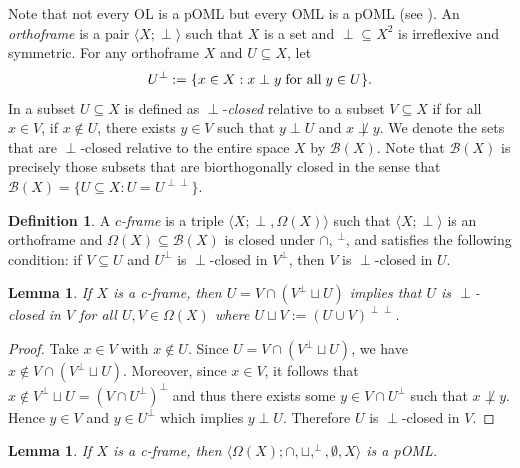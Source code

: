\documentclass{amsart}
\theoremstyle{plain}
\newtheorem{lemma}[theorem]{Lemma}
\theoremstyle{definition}
\newtheorem{definition}[theorem]{Definition}
\begin{document}
   Note that not every OL is a pOML but every OML is a pOML (see \cite[Propositions 2 and 3]{leem}).                                    An \emph{orthoframe} is a pair $\langle X;\perp\rangle$ such that $X$ is a set and $\perp\subseteq X^2$ is irreflexive and symmetric. For any orthoframe $X$ and $U\subseteq X$, let \[U^{\perp}:=\{x\in X:x\perp y\hspace{.1cm}\text{for all}\hspace{.1cm}y\in U\}.\] In \cite{goldblatt2} a subset $U\subseteq X$ is defined as $\perp$-\emph{closed} relative to a subset $V\subseteq X$ if for all $x\in V$, if 
    $x\not\in U$, there exists $y\in V$ such that $y\perp U$ and $x\not\perp y$. We denote the sets that are $\perp$-closed relative to the entire space $X$ by $\mathcal{B}(X)$. Note that $\mathcal{B}(X)$ is precisely those subsets that are biorthogonally closed in the sense that $\mathcal{B}(X)=\{U\subseteq X:U=U^{\perp\perp}\}$.     
\begin{definition}
    A $c$\emph{-frame} is a triple $\langle X;\perp,\Omega(X)\rangle$ such that $\langle X;\perp\rangle$ is an orthoframe and $\Omega(X)\subseteq\mathcal{B}(X)$ is closed under $\cap$, $^{\perp}$, and satisfies the following condition: if $V\subseteq U$ and $U^{\perp}$ is $\perp$-closed in $V^{\perp}$, then $V$ is $\perp$-closed in $U$.
\end{definition}
\begin{lemma}\label{lemma 2.3}
    If $X$ is a c-frame, then $U=V\cap(V^{\perp}\sqcup U)$ implies that $U$ is $\perp$-closed in $V$ for all $U,V\in\Omega(X)$ where $U\sqcup V:=(U\cup V)^{\perp\perp}$.  
\end{lemma}
\begin{proof}
    Take $x\in V$ with $x\not\in U$. Since $U=V\cap(V^{\perp}\sqcup U)$, we have $x\not\in V\cap(V^{\perp}\sqcup U)$. Moreover, since $x\in V$, it follows that $x\not\in V^{\perp}\sqcup U=(V\cap U^{\perp})^{\perp}$ and thus there exists some $y\in V\cap U^{\perp}$ such that $x\not\perp y$. Hence $y\in V$ and $y\in U^{\perp}$ which implies $y\perp U$. Therefore $U$ is $\perp$-closed in $V$.
    \end{proof}
\begin{lemma}\label{c-frame to poml}
    If $X$ is a c-frame, then $\langle\Omega(X);\cap,\sqcup,^{\perp},\emptyset,X\rangle$ is a pOML. 
\end{lemma}
\end{document}
